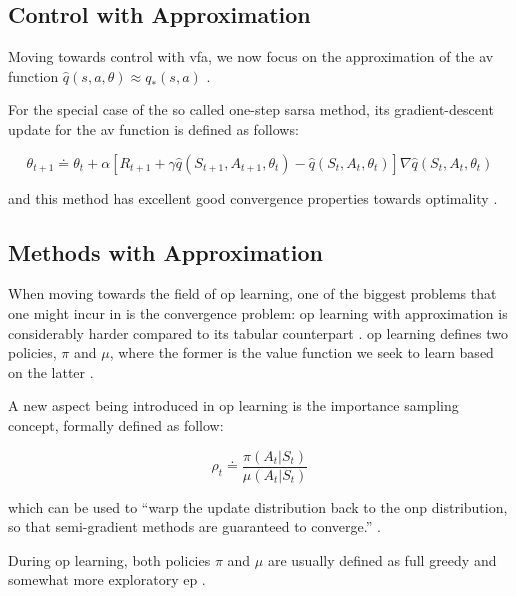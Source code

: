 \documentclass{seal_thesis}
\begin{document}
\subsection{ Control with Approximation}
\label{subsec:onpol_control}

Moving towards control with \gls{vfa}, we now focus on the approximation of the \gls{av} function $\hat{q} (s,a,\theta) \approx q_* (s,a)$ \cite[p. 229]{Sutton2017}.

For the special case of the so called one-step \gls{sarsa} method, its gradient-descent update for the \gls{av} function is defined as follows:

\begin{equation}
	\theta_{t+1} \doteq \theta_t + \alpha [ R_{t+1} + \gamma \hat{q} (S_{t+1}, A_{t+1}, \theta_t) - \hat{q} (S_t, A_t, \theta_t) ] \nabla \hat{q} (S_t, A_t, \theta_t)
\end{equation}

and this method has excellent good convergence properties towards optimality \cite[p. 230]{Sutton2017}.

\subsection{ Methods with Approximation}
\label{subsec:offpol_methods}

When moving towards the field of \gls{op} learning, one of the biggest problems that one might incur in is the convergence problem: \gls{op} learning with approximation is considerably harder compared to its tabular counterpart \cite[p. 243]{Sutton2017}. \gls{op} learning defines two policies, $\pi$ and $\mu$, where the former is the value function we seek to learn based on the latter \cite[p. 243]{Sutton2017}.

A new aspect being introduced in \gls{op} learning is the importance sampling concept, formally defined as follow:

\begin{equation}
\label{eq:importance_sampling}
	\rho_t \doteq \frac{\pi(A_t|S_t)}{\mu(A_t|S_t)}
\end{equation}

which can be used to ``warp the update distribution back to the \gls{onp} distribution, so that semi-gradient methods are guaranteed to converge.'' \cite[p. 243]{Sutton2017}.

During \gls{op} learning, both policies $\pi$ and $\mu$ are usually defined as full greedy and somewhat more exploratory \gls{ep} \cite[p. 243]{Sutton2017}.
\end{document}
